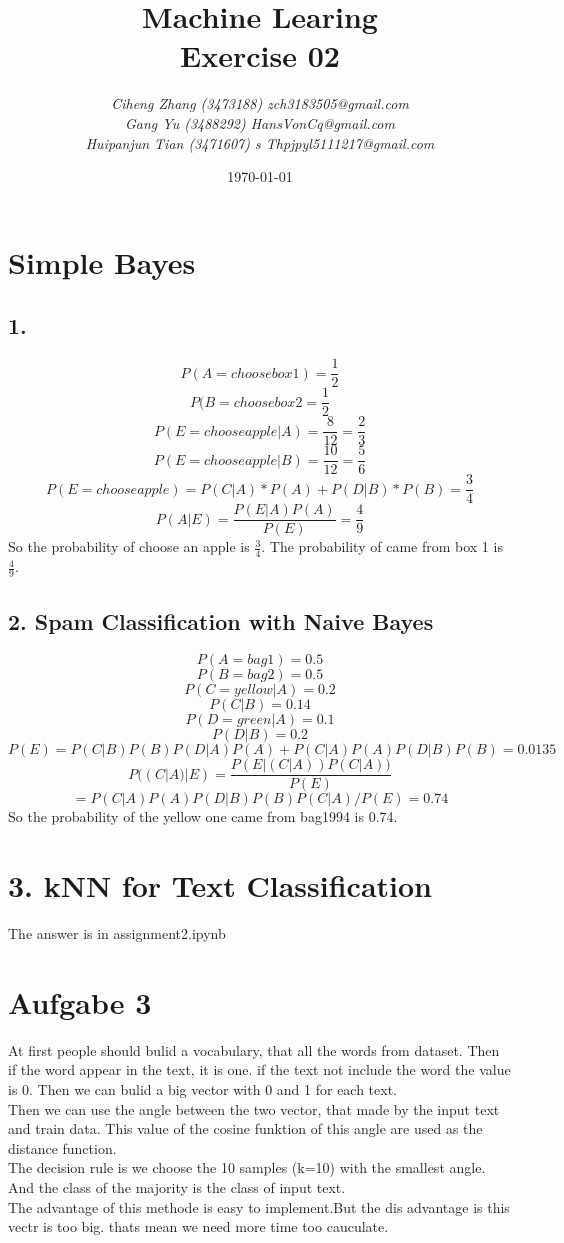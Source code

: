 \documentclass{article}
\begin{document}
\begin{titlepage}
    \title{\Huge \textbf{Machine Learing\\Exercise 02} }
    \author{\LARGE \textsl{Ciheng Zhang (3473188) zch3183505@gmail.com}\\\LARGE \textsl{Gang Yu (3488292) HansVonCq@gmail.com}\\\LARGE \textsl{Huipanjun Tian (3471607) s Thpjpyl5111217@gmail.com} \\[200pt]}
    \date{\today}
    \maketitle
    \thispagestyle{empty}
\end{titlepage}
\newpage
\section{ Simple Bayes}
\subsection*{1.}
\[P(A=choose box1)=\frac{1}{2}\]
\[P(B=choose box2=\frac{1}{2}\]
\[P(E=choose  apple|A)=\frac{8}{12}=\frac{2}{3}\]
\[P(E=choose apple|B)=\frac{10}{12}=\frac{5}{6}\]
\[P(E=choose apple)=P(C|A)*P(A)+P(D|B)*P(B)=\frac{3}{4}\]
\[P(A|E)=\frac{P(E|A)P(A)}{P(E)}=\frac{4}{9}\]
So the probability of choose an apple is $\frac{3}{4}$. The probability of came from box 1 is $\frac{4}{9} $.
\subsection*{2. Spam Classification with Naive Bayes}
\[P(A=bag1)=0.5\]
\[P(B=bag2)=0.5\]
\[P(C=yellow|A)=0.2\]
\[P(C|B)=0.14\]
\[P(D=green|A)=0.1\]
\[P(D|B)=0.2\]
\[P(E)=P(C|B)P(B)P(D|A)P(A)+P(C|A)P(A)P(D|B)P(B)=0.0135\]
\[P((C|A)|E)=\frac{P(E|(C|A))P(C|A))}{P(E)}\]
\[=P(C|A)P(A)P(D|B)P(B)P(C|A)/P(E)=0.74\]
So the probability of the yellow one came from bag1994 is 0.74.
\section{3. kNN for Text Classification}
The answer is in assignment2.ipynb
\section{Aufgabe 3}
At first people should bulid a vocabulary, that all the words from dataset. Then if the word appear in the text, it is one. if the text not include the word the value is 0. Then we can bulid a big vector with 0 and 1 for each text.\\
Then we can use the angle between the two vector, that made by the input text and train data. This value of the cosine funktion of this angle are used as the distance function.\\
The decision rule is we choose the 10 samples (k=10) with the smallest angle. And the class of the majority is the class of input text.\\
The advantage of this methode is easy to implement.But the dis advantage is this vectr is too big. thats mean we need more time too cauculate.
\end{document}
